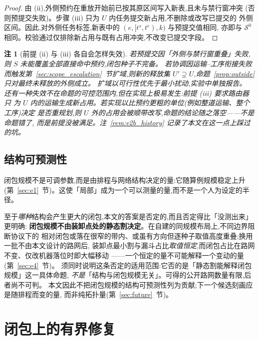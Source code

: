 \documentclass[manuscript,screen,review]{acmart}
\newtheorem{remark}{注}
\begin{document}
\begin{proof}
由 (ii),外侧预约在重放开始前已按其原区间写入新表,且未与禁行窗冲突
(否则预提交失败)。步骤 (iii) 只为 \(U\) 内任务提交新占用,不删除或改写已提交的
外侧区间。因此,对外侧任务标签,新表中的 \((e,[t^s,t^e),k)\) 与预提交值相同,
亦即与 \(\mathcal{S}^0\) 相同。校验通过仅排除新占用与既有占用冲突,不改变已提交字段。
\end{proof}

\begin{remark}[前提 (ii) 与 (iii) 各自会怎样失效]
\label{rem:precommit}
若预提交因「外侧与禁行窗重叠」失败,则 \(S\) 未能覆盖全部直接命中预约,闭包种子不完备。
若协调因运输--工序衔接失败而触发第~\ref{sec:scope_escalation}~节扩域,则新的释放集
\(U'\supsetneq U\),命题~\ref{prop:outside} 只对最终未释放的外侧成立。
扩域以可行性优先于最小扰动,实验中单独报告。
还有一种失效不在命题的可控范围内,但在实现上极易发生:前提 (iii) 要求路由器\emph{只}
为 \(U\) 内的运输生成新占用。若实现以比预约更粗的单位(例如整道运输、整个工序)决定
是否重规划,则 \(U\) 外的占用会被顺带改写,命题的结论随之落空——不是命题错了,
而是前提没被满足。注~\ref{rem:e2b_history} 记录了本文在这一点上踩过的坑。
\end{remark}

\subsection{结构可预测性}
\label{sec:structure}

闭包规模不是可调参数,而是由排程与网络结构决定的量:它随算例规模稳定上升
(第~\ref{sec:e1}~节)。这使「局部」成为一个可以测量的量,而不是一个人为设定的半径。

至于\emph{哪种}结构会产生更大的闭包,本文的答案是否定的,而且否定得比「没测出来」更明确:
\textbf{闭包规模不由装卸点处的静态割决定}。在自建的同规模布局上,不同边界阻断协议下的
相对闭包或落在很窄的带内、或虽有方向但逐种子取值高度重叠;换用一批不由本文设计的路网后,
装卸点最小割与漏斗占比\emph{取值恒定},而闭包占比在路网不变、仅改机器落位时即大幅移动
——一个恒定的量不可能解释一个变动的量(第~\ref{sec:e4}~节)。
须同时说明这条否定的适用范围:它否的是「静态割能解释闭包规模」这一具体命题,
\emph{不是}「结构与闭包规模无关」。可得的公开路网数量有限,后者尚不可判。
本文因此不把闭包规模的结构可预测性列为贡献;下一个候选刻画应是随排程而变的量,
而非纯拓扑量(第~\ref{sec:future}~节)。

\section{闭包上的有界修复}
\label{sec:repair}
\end{document}
